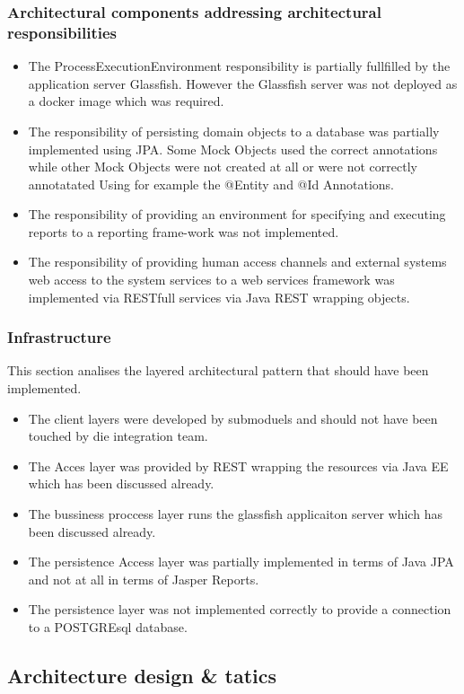 \documentclass[a4paper,10pt]{article}
\begin{document}
\subsubsection{Architectural components addressing architectural responsibilities}
\begin{itemize}
	\item The ProcessExecutionEnvironment responsibility is partially fullfilled by the application server Glassfish. However the Glassfish server was not deployed as a docker image which was required.
	\item The responsibility of persisting domain objects to a database was partially implemented using JPA. Some Mock Objects used the correct annotations
	while other Mock Objects were not created at all or were not correctly annotatated Using for example the @Entity and @Id Annotations.
	\item The responsibility of providing an environment for specifying and executing reports to a reporting frame-work was not implemented.
	\item The responsibility of providing human access channels and external systems web access to the system services to a web services framework was
	implemented via RESTfull services via Java REST wrapping objects.
\end{itemize}

\subsubsection{Infrastructure}
This section analises the layered architectural pattern that should have been implemented.
\begin{itemize}
	\item The client layers were developed by submoduels and should not have been touched by die integration team.
	\item The Acces layer was provided by REST wrapping the resources via Java EE which has been discussed already.
	\item The bussiness proccess layer runs the glassfish applicaiton server which has been discussed already.
	\item The persistence Access layer was partially implemented in terms of Java JPA and not at all in terms of Jasper Reports.
	\item The persistence layer was not implemented correctly to provide a connection to a POSTGREsql database.
\end{itemize}

\subsection{Architecture design \& tatics}
\end{document}
